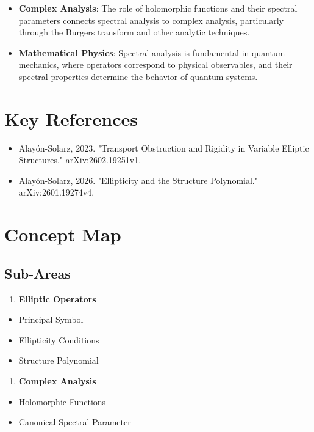 \documentclass[11pt,a4paper]{article}
\begin{document}
\begin{itemize}
\item \textbf{Complex Analysis}: The role of holomorphic functions and their spectral parameters connects spectral analysis to complex analysis, particularly through the Burgers transform and other analytic techniques.
\end{itemize}

\begin{itemize}
\item \textbf{Mathematical Physics}: Spectral analysis is fundamental in quantum mechanics, where operators correspond to physical observables, and their spectral properties determine the behavior of quantum systems.
\end{itemize}

\section{Key References}
\begin{itemize}
\item Alayón-Solarz, 2023. "Transport Obstruction and Rigidity in Variable Elliptic Structures." arXiv:2602.19251v1.
\item Alayón-Solarz, 2026. "Ellipticity and the Structure Polynomial." arXiv:2601.19274v4.
\end{itemize}

\section{Concept Map}
\subsection{Sub-Areas}
\begin{enumerate}
\item \textbf{Elliptic Operators}
\end{enumerate}
\begin{itemize}
\item Principal Symbol
\item Ellipticity Conditions
\item Structure Polynomial
\end{itemize}

\begin{enumerate}
\item \textbf{Complex Analysis}
\end{enumerate}
\begin{itemize}
\item Holomorphic Functions
\item Canonical Spectral Parameter
\end{itemize}
\end{document}
